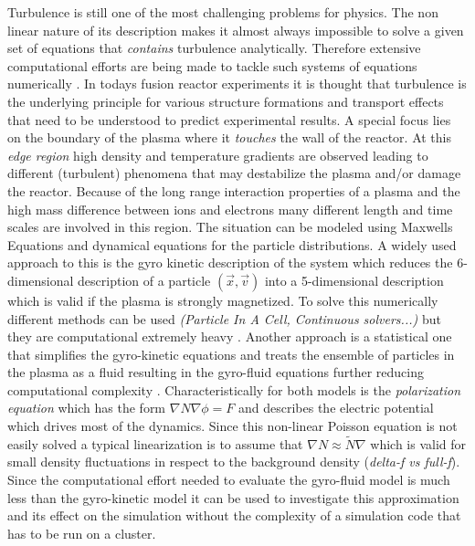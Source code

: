 \documentclass[master.tex]{subfiles}
\begin{document}
Turbulence is still one of the most challenging problems for physics. The non linear nature of its description makes it almost always impossible to solve a given set of equations that \textit{contains} turbulence analytically. Therefore extensive computational efforts are being made to tackle such systems of equations numerically \cite{IntroTurbulence}.\newline
In todays fusion reactor experiments it is thought that turbulence is the underlying principle for various structure formations and transport effects that need to be understood to predict experimental results. A special focus lies on the boundary of the plasma where it \textit{touches} the wall of the reactor. At this \textit{edge region} high density and temperature gradients are observed leading to different (turbulent) phenomena that may destabilize the plasma and/or damage the reactor.\newline
Because of the long range interaction properties of a plasma and the high mass difference between ions and electrons many different length and time scales are involved in this region.\newline
The situation can be modeled using Maxwells Equations and dynamical equations for the particle distributions. A widely used approach to this is the gyro kinetic description of the system which reduces the 6-dimensional description of a particle $(\vec{x},\vec{v})$ into a 5-dimensional description which is valid if the plasma is strongly magnetized. To solve this numerically different methods can be used \textit{(Particle In A Cell, Continuous solvers...)} but they are computational extremely heavy \cite{GyroKineticCodes}.\newline
Another approach is a statistical one that simplifies the gyro-kinetic equations and treats the ensemble of particles in the plasma as a fluid resulting in the gyro-fluid equations further reducing computational complexity \cite{HeldDisseration}.\newline
Characteristically for both models is the \textit{polarization equation} which has the form $\nabla N \nabla \phi = F$ and describes the electric potential which drives most of the dynamics. Since this non-linear Poisson equation is not easily solved a typical linearization is to assume that $\nabla N \approx \tilde{N} \nabla$ which is valid for small density fluctuations in respect to the background density (\textit{delta-f vs full-f}). Since the computational effort needed to evaluate the gyro-fluid model is much less than the gyro-kinetic model it can be used to investigate this approximation and its effect on the simulation without the complexity of a simulation code that has to be run on a cluster.\newline
\end{document}

